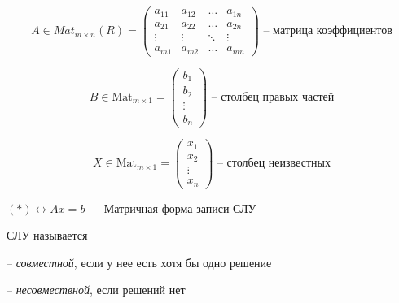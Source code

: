 \[
    A \in Mat_{m \times n}(R) = \begin{pmatrix}
        a_{11} & a_{12} & \dots & a_{1n} \\
        a_{21} & a_{22} & \dots & a_{2n} \\
        \vdots & \vdots & \ddots & \vdots \\
        a_{m1} & a_{m2} & \dots & a_{mn}
    \end{pmatrix} \text{ -- матрица коэффициентов}
\]

\[
    B \in \text{Mat}_{m \times 1} = \begin{pmatrix}
        b_1 \\ b_2 \\ \vdots \\ b_n
    \end{pmatrix} \text{ -- столбец правых частей}
\]

\[
    X \in \text{Mat}_{m \times 1} = \begin{pmatrix}
        x_1 \\ x_2 \\ \vdots \\ x_n
    \end{pmatrix} \text{ -- столбец неизвестных}
\]


$(*) \leftrightarrow Ax = b$ ---
Матричная форма записи СЛУ

\begin{definition}
    СЛУ называется 

    -- \textit{совместной}, если у нее есть хотя бы одно решение

    -- \textit{несовмествной}, если решений нет
\end{definition}

